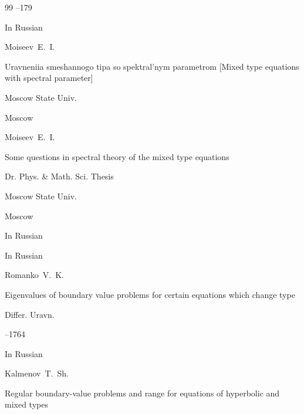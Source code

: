 \begin{thebibliography}{99}
--179






\lang In Russian

\by Moiseev~E.~I.

\book Uravneniia smeshannogo tipa so spektral'nym parametrom \rm [Mixed type equations with spectral parameter]


\publ Moscow State Univ.

\publaddr Moscow 









\by Moiseev~E.~I.

\thesis  Some questions in spectral theory of the mixed type equations

\thesisinfo Dr. Phys. \& Math. Sci. Thesis

\publ Moscow State Univ.

\publaddr Moscow 


\lang In Russian




\lang In Russian

\by Romanko~V.~K.

\paper Eigenvalues of boundary value problems for certain equations which change type

\jour Differ. Uravn.




--1764













\lang In Russian

\by Kalmenov~T.~Sh.

\thesis Regular boundary-value problems and range for equations of hyperbolic and mixed types


\end{thebibliography}
